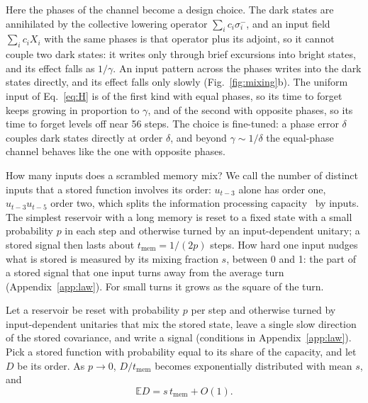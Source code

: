 Here the phases of the channel become a design choice. The dark states are annihilated by the collective lowering
operator $\sum_ic_i\sigma_i^-$, and an input field $\sum_ic_iX_i$ with the same phases is that operator plus its
adjoint, so it cannot couple two dark states: it writes only through brief excursions into bright states, and its
effect falls as $1/\gamma$. An input pattern across the phases writes into the dark states directly, and its effect
falls only slowly (Fig.~\ref{fig:mixing}b). The uniform input of Eq.~\eqref{eq:H} is of the first kind with equal
phases, so its time to forget keeps growing in proportion to $\gamma$, and of the second with opposite phases, so its
time to forget levels off near 56 steps. The choice is fine-tuned: a phase error $\delta$ couples dark states
directly at order $\delta$, and beyond $\gamma\sim1/\delta$ the equal-phase channel behaves like the one with
opposite phases.

How many inputs does a scrambled memory mix? We call the number of distinct inputs that a stored function involves its
order: $u_{t-3}$ alone has order one, $u_{t-3}u_{t-5}$ order two, which splits the information processing
capacity~\cite{Dambre2012,MartinezPenaIPC2023} by inputs. The simplest reservoir with a long memory is reset to a
fixed state with a small probability $p$ in each step and otherwise turned by an input-dependent unitary; a stored
signal then lasts about $t_{\mathrm{mem}}=1/(2p)$ steps. How hard one input nudges
what is stored is measured by its mixing fraction $s$, between 0 and 1: the part of a stored signal that one input
turns away from the average turn (Appendix~\ref{app:law}). For small turns it grows as the square of the turn.

\begin{keybox}
\begin{theorem}\label{thm:law}
Let a reservoir be reset with probability $p$ per step and otherwise turned by input-dependent unitaries that mix the
stored state, leave a single slow direction of the stored covariance, and write a signal (conditions in
Appendix~\ref{app:law}). Pick a stored function with probability
equal to its share of the capacity, and let $D$ be its order. As $p\to0$, $D/t_{\mathrm{mem}}$ becomes exponentially
distributed with mean $s$, and
\begin{equation*}
  \mathbb ED=s\,t_{\mathrm{mem}}+O(1).
\end{equation*}
\end{theorem}
\end{keybox}

